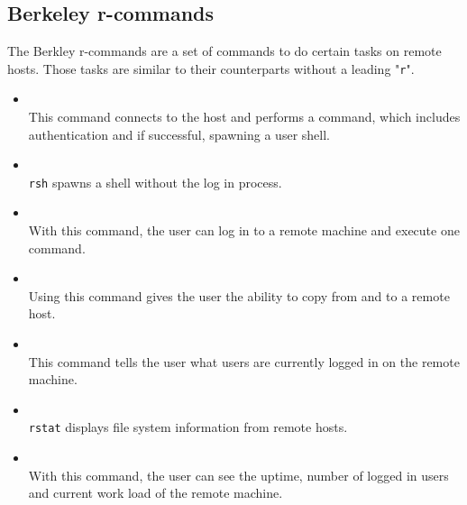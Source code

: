 \documentclass[10pt,a4paper,titlepage,twoside,english,final]{zhawreprt}
\begin{document}
\subsection{Berkeley r-commands}\label{ssec:BerkeleyRCommands}
The Berkley r-commands are a set of commands to do certain tasks on remote hosts. Those tasks are similar to their counterparts without a leading "\texttt{r}".
\begin{itemize}
\item \cite{rlogin}\\
This command connects to the host and performs a \cite{login} command, which includes authentication and if successful, spawning a user \gls{shell}.
\item \cite{rsh}\\
\texttt{rsh} spawns a \gls{shell} without the log in process.
\item \cite{rexec}\\
With this command, the user can log in to a remote machine and execute one command.
\item \cite{rcp}\\
Using this command gives the user the ability to copy from and to a remote host.
\item \cite{rwho}\\
This command tells the user what users are currently logged in on the remote machine.
\item \cite{rstat}\\
\texttt{rstat} displays file system information from remote hosts.
\item \cite{ruptime}\\
With this command, the user can see the uptime, number of logged in users and current work load of the remote machine.
\end{itemize}
\end{document}
